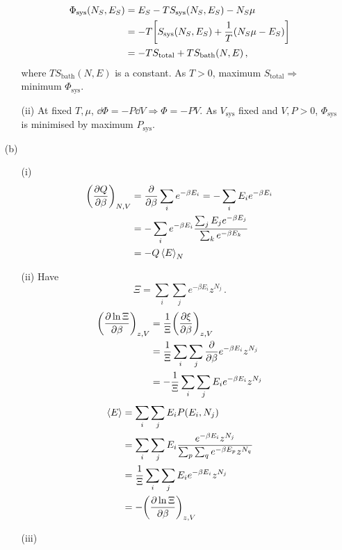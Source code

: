 \documentclass{article}
\begin{document}
\begin{enumerate}
\begin{enumerate}
\begin{align*}
                \Phi_{\text{sys}}(N_S,E_S)&=E_S-TS_{\text{sys}}(N_S,E_S)-N_S\mu\\
                &=-T\qty[S_{\text{sys}}(N_S,E_S)+\frac{1}{T}(N_S\mu-E_S)]\\
                &=-TS_{\text{total}}+TS_{\text{bath}}(N,E)\,,
            \end{align*}
            where $TS_{\text{bath}}(N,E)$ is a constant. As $T>0$, maximum $S_{\text{total}}\Rightarrow$ minimum $\Phi_{\text{sys}}$.
            \item[(ii)] At fixed $T,\mu$, $\dd{\Phi}=-P\dd{V}\Rightarrow\Phi=-PV$. As $V_{\text{sys}}$ fixed and $V,P>0$, $\Phi_{\text{sys}}$ is minimised by maximum $P_{\text{sys}}$.
            
        \end{enumerate}
        \item[(b)]
        \begin{enumerate}
            \item[(i)]
            \begin{align*}
                \qty(\pdv{Q}{\beta})_{N,V}&=\pdv{\beta}\sum_i e^{-\beta E_i}=-\sum_iE_ie^{-\beta E_i}\\
                &=-\sum_i e^{-\beta E_i}\frac{\sum_j E_j e^{-\beta E_j}}{\sum_k e^{-\beta E_k}}\\
                &=-Q\expval{E}_N
            \end{align*}
            \item[(ii)] Have
            $$\Xi=\sum_i\sum_j e^{-\beta E_i}z^{N_j}\,.$$
            \begin{align*}
                \qty(\pdv{\ln\Xi}{\beta})_{z,V}&=\frac{1}{\Xi}\qty(\pdv{\xi}{\beta})_{z,V}\\
                &=\frac{1}{\Xi}\sum_i\sum_j\pdv{\beta}e^{-\beta E_i}z^{N_j}\\
                &=-\frac{1}{\Xi}\sum_i\sum_j E_i e^{-\beta E_i}z^{N_j}
            \end{align*}
            \begin{align*}
                \expval{E}&=\sum_i\sum_jE_i P(E_i,N_j)\\
                &=\sum_i\sum_jE_i\frac{e^{-\beta E_i}z^{N_j}}{\sum_p\sum_q e^{-\beta E_p}z^{N_q}}\\
                &=\frac{1}{\Xi}\sum_i\sum_jE_i e^{-\beta E_i}z^{N_j}\\
                &=-\qty(\pdv{\ln\Xi}{\beta})_{z,V}
            \end{align*}
            \item[(iii)]

\end{enumerate}
\end{enumerate}
\end{document}
